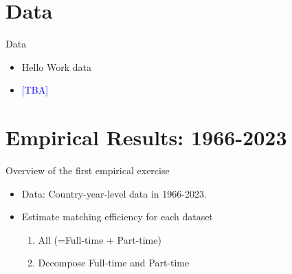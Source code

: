 \documentclass[aspectratio=169]{beamer}
\begin{document}
    
    


\section{Data}

\begin{frame}{Data}
  \begin{itemize}
      \item Hello Work data
      \item \textcolor{blue}{[TBA]}
  \end{itemize}
\end{frame}



\section{Empirical Results: 1966-2023}


\begin{frame}{Overview of the first empirical exercise}
    \begin{itemize}
        \item Data: Country-year-level data in 1966-2023.
        \item Estimate matching efficiency for each dataset
        \begin{enumerate}
            \item All (=Full-time + Part-time)
            \item Decompose Full-time and Part-time
        \end{enumerate}
    \end{itemize}
\end{frame}
\end{document}
